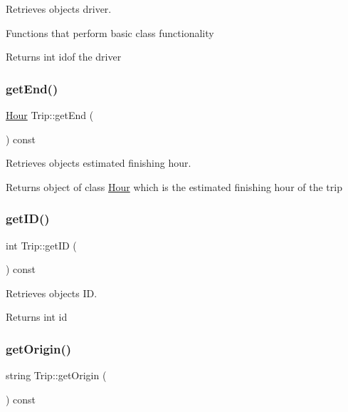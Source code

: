 Retrieves object\textquotesingle{}s driver. 

Functions that perform basic class functionality \begin{DoxyReturn}{Returns}
int idof the driver 
\end{DoxyReturn}
\mbox{\label{group___trip_ga6ed6b87b4206efe21fe2c6744c73061b}} 
\subsubsection{\texorpdfstring{get\+End()}{getEnd()}}
{\footnotesize\ttfamily \hyperlink{class_hour}{Hour} Trip\+::get\+End (\begin{DoxyParamCaption}{ }\end{DoxyParamCaption}) const}



Retrieves object\textquotesingle{}s estimated finishing hour. 

\begin{DoxyReturn}{Returns}
object of class \hyperlink{class_hour}{Hour} which is the estimated finishing hour of the trip 
\end{DoxyReturn}
\mbox{\label{group___trip_ga61fea247b075bfac3f6115da4bd56ef5}} 
\subsubsection{\texorpdfstring{get\+I\+D()}{getID()}}
{\footnotesize\ttfamily int Trip\+::get\+ID (\begin{DoxyParamCaption}{ }\end{DoxyParamCaption}) const}



Retrieves object\textquotesingle{}s ID. 

\begin{DoxyReturn}{Returns}
int id 
\end{DoxyReturn}
\mbox{\label{group___trip_gaf63e96a9b31ad6def658944bc6a9f327}} 
\subsubsection{\texorpdfstring{get\+Origin()}{getOrigin()}}
{\footnotesize\ttfamily string Trip\+::get\+Origin (\begin{DoxyParamCaption}{ }\end{DoxyParamCaption}) const}



